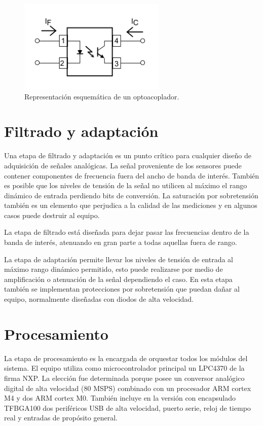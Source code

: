 \begin{figure}[ht]
	\centering
	\includegraphics[width=70mm]{./Figures/opto.png}
	\caption{Representación esquemática de un optoacoplador.}
	\label{fig:opto}
\end{figure}

\section{Filtrado y adaptación}
Una etapa de filtrado y adaptación es un punto crítico para cualquier diseño de adquisición de señales analógicas. La señal proveniente de los sensores puede contener componentes de frecuencia fuera del ancho de banda de interés. También es posible que los niveles de tensión de la señal no utilicen al máximo el rango dinámico de entrada perdiendo bits de conversión. La saturación por sobretensión también es un elemento que perjudica a la calidad de las mediciones y en algunos casos puede destruir al equipo. 

La etapa de filtrado está diseñada para dejar pasar las frecuencias dentro de la banda de interés, atenuando en gran parte a todas aquellas fuera de rango.

La etapa de adaptación permite llevar los niveles de tensión de entrada al máximo rango dinámico permitido, esto puede realizarse por medio de amplificación o atenuación de la señal dependiendo el caso. En esta etapa también se implementan protecciones por sobretensión que puedan dañar al equipo, normalmente diseñadas con diodos de alta velocidad.

\section{Procesamiento}
La etapa de procesamiento es la encargada de orquestar todos los módulos del sistema. El equipo utiliza como microcontrolador principal un LPC4370 \citep{micro:lpc4370} de la firma NXP. La elección fue determinada porque posee un conversor analógico digital de alta velocidad (80 MSPS) combinado con un procesador ARM cortex M4 y dos ARM cortex M0. También incluye en la versión con encapsulado TFBGA100 dos periféricos USB de alta velocidad, puerto serie, reloj de tiempo real y entradas de propósito general.

